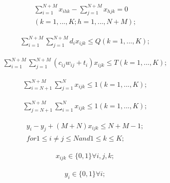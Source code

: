\documentclass[conference]{IEEEtran}
\begin{document}
\begin{equation}
\label{eq:4}
\begin{aligned}
\sum_{i=1}^{N+M}x_{ihk} - \sum_{j=1}^{N+M}x_{hjk} = 0 \\
(k=1,...,K; h=1,...,N+M);
\end{aligned}
\end{equation}

\begin{equation}
\label{eq:5}
\begin{aligned}
\sum_{i=1}^{N+M} \sum_{j=1}^{N+M} d_ix_{ijk} \leq Q (k=1,...,K);
\end{aligned}
\end{equation}

\begin{equation}
\label{eq:6}
\begin{aligned}
\sum_{i=1}^{N+M} \sum_{j=1}^{N+M} (c_{ij}w_{ij} + t_i) x_{ijk} \leq T (k=1,...,K);
\end{aligned}
\end{equation}

\begin{equation}
\label{eq:7}
\begin{aligned}
\sum_{i=N+1}^{N+M} \sum_{j=1}^{N} x_{ijk} \leq 1 (k=1,...,K);
\end{aligned}
\end{equation}

\begin{equation}
\label{eq:8}
\begin{aligned}
\sum_{j=N+1}^{N+M} \sum_{i=1}^{N} x_{ijk} \leq 1 (k=1,...,K);
\end{aligned}
\end{equation}

\begin{equation}
\label{eq:9}
\begin{aligned}
y_i - y_j + (M + N)x_{ijk} \leq N + M - 1; \\
for 1 \leq i \neq j \leq N and 1 \leq k \leq K;
\end{aligned}
\end{equation}

\begin{equation}
\label{eq:10}
\begin{aligned}
x_{ijk} \in \{0, 1\} \forall i,j,k;
\end{aligned}
\end{equation}

\begin{equation}
\label{eq:11}
\begin{aligned}
y_i \in \{0,1\} \forall i;
\end{aligned}
\end{equation}
\end{document}
